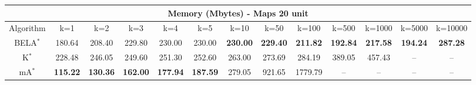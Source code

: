 \begin{tabular}{c|cccccccccccc}\toprule
\multicolumn{13}{c}{Memory (Mbytes) - Maps 20 unit}\\ \midrule
Algorithm & k=1 & k=2 & k=3 & k=4 & k=5 & k=10 & k=50 & k=100 & k=500 & k=1000 & k=5000 & k=10000 \\ \midrule
BELA$^*$ & 180.64 & 208.40 & 229.80 & 230.00 & 230.00 & \textbf{230.00} & \textbf{229.40} & \textbf{211.82} & \textbf{192.84} & \textbf{217.58} & \textbf{194.24} & \textbf{287.28} \\
K$^*$ & 228.48 & 246.05 & 249.60 & 251.30 & 252.60 & 263.00 & 273.69 & 284.19 & 389.05 & 457.43 & -- & -- \\
mA$^*$ & \textbf{115.22} & \textbf{130.36} & \textbf{162.00} & \textbf{177.94} & \textbf{187.59} & 279.05 & 921.65 & 1779.79 & -- & -- & -- & -- \\ \bottomrule 
\end{tabular}
